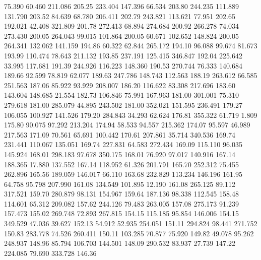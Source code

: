   75.390   60.460  211.086       205.25
 233.404  147.396   66.534       203.80
 244.235  111.889  131.790       203.52
  84.639   68.780  206.411       202.79
 243.821  113.621   77.951       202.65
 192.021   42.408  321.809       201.78
 272.413   68.894  274.684       200.92
 266.278   74.034  273.430       200.05
 264.043   99.015  101.864       200.05
  60.671  102.652  148.824       200.05
 264.341  132.062  141.159       194.86
  60.322   62.844  265.172       194.10
  96.088   99.674   81.673       193.99
 110.474   78.643  211.132       193.85
 237.191  125.415  346.847       192.04
 225.642   33.995  117.681       191.39
 244.926  116.223  148.360       190.53
 270.744   76.333  140.684       189.66
  92.599   78.819   62.077       189.63
 247.786  148.743  112.563       188.19
 263.612   66.585  251.563       187.06
  85.922   93.929  208.007       186.20
 116.622   83.308  217.696       183.60
 143.604  148.685   21.554       182.73
 106.846   75.991  167.963       181.00
 301.001   75.310  279.618       181.00
 285.079   44.895  243.502       181.00
 352.021  151.595  236.491       179.27
 106.055  100.927  141.526       179.20
 284.843   34.293   62.624       176.81
 355.322   61.719    1.809       175.80
  90.075   97.292  213.204       174.94
  58.533   94.557  215.362       174.07
  95.597   46.989  217.563       171.09
  70.561   65.691  100.442       170.61
 207.861   35.714  340.536       169.74
 231.441  110.067  135.051       169.74
 227.831   64.583  272.434       169.09
 115.110   96.035  145.924       168.01
 298.183   97.678  350.175       168.01
  76.920   97.017  140.916       167.14
 188.365   17.880  137.552       167.14
 118.952   61.326  201.791       165.70
 252.312   75.455  262.896       165.56
 189.059  146.017   66.110       163.68
 232.829  113.234  146.196       161.95
  64.758   95.798  207.990       161.08
 134.549  101.895   12.190       161.08
 265.125   89.112  317.521       159.70
 280.879   98.131  154.967       159.64
 187.136   98.338  112.545       158.48
 114.601   65.312  209.082       157.62
 244.126   79.483  263.005       157.08
 275.173   91.239  157.473       155.02
 269.748   72.893  267.815       154.15
 115.185   95.854  146.006       154.15
 349.529   47.036   39.627       152.13
  54.912   52.935  254.051       151.11
 294.824   98.441  271.752       150.83
 283.778   74.526  260.411       150.11
 103.285   70.877   75.920       149.82
  49.078   95.262  248.937       148.96
  85.794  106.703  144.501       148.09
 290.532   83.937   27.739       147.22
 224.085   79.690  333.728       146.36
